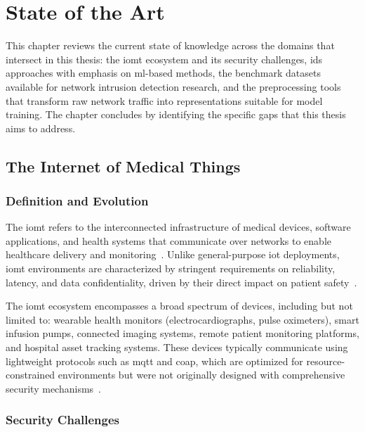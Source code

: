 \chapter{State of the Art}
\label{ch:state-of-art}

This chapter reviews the current state of knowledge across the domains that intersect in this thesis: the \gls{iomt} ecosystem and its security challenges, \gls{ids} approaches with emphasis on \gls{ml}-based methods, the benchmark datasets available for network intrusion detection research, and the preprocessing tools that transform raw network traffic into representations suitable for model training. The chapter concludes by identifying the specific gaps that this thesis aims to address.

\section{The Internet of Medical Things}
\label{sec:iomt}

\subsection{Definition and Evolution}
\label{subsec:iomt-def}

The \gls{iomt} refers to the interconnected infrastructure of medical devices, software applications, and health systems that communicate over networks to enable healthcare delivery and monitoring~\cite{dimitrov2016medical}. Unlike general-purpose \gls{iot} deployments, \gls{iomt} environments are characterized by stringent requirements on reliability, latency, and data confidentiality, driven by their direct impact on patient safety~\cite{domenech2024ensuring}.

The \gls{iomt} ecosystem encompasses a broad spectrum of devices, including but not limited to: wearable health monitors (electrocardiographs, pulse oximeters), smart infusion pumps, connected imaging systems, remote patient monitoring platforms, and hospital asset tracking systems. These devices typically communicate using lightweight protocols such as \gls{mqtt} and \gls{coap}, which are optimized for resource-constrained environments but were not originally designed with comprehensive security mechanisms~\cite{domenech2025preventive}.

\subsection{Security Challenges}
\label{subsec:iomt-security}

